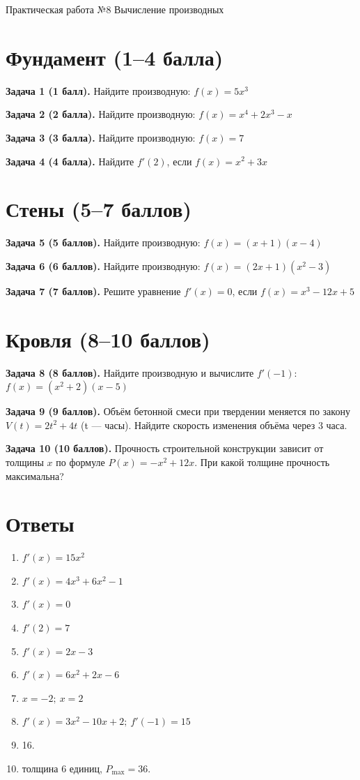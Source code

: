 \documentclass{umk-matematika}
\begin{document}
\maketitlepage
    {Практическая работа №8}
    {Вычисление производных}
    {}

\section{Фундамент (1--4 балла)}

\textbf{Задача 1 (1 балл).} Найдите производную: $f(x) = 5x^3$

\textbf{Задача 2 (2 балла).} Найдите производную: $f(x) = x^4 + 2x^3 - x$

\textbf{Задача 3 (3 балла).} Найдите производную: $f(x) = 7$

\textbf{Задача 4 (4 балла).} Найдите $f'(2)$, если $f(x) = x^2 + 3x$

\section{Стены (5--7 баллов)}

\textbf{Задача 5 (5 баллов).} Найдите производную: $f(x) = (x + 1)(x - 4)$

\textbf{Задача 6 (6 баллов).} Найдите производную: $f(x) = (2x + 1)(x^2 - 3)$

\textbf{Задача 7 (7 баллов).} Решите уравнение $f'(x) = 0$, если $f(x) = x^3 - 12x + 5$

\section{Кровля (8--10 баллов)}

\textbf{Задача 8 (8 баллов).} Найдите производную и вычислите $f'(-1)$: $f(x) = (x^2 + 2)(x - 5)$

\textbf{Задача 9 (9 баллов).} Объём бетонной смеси при твердении меняется по закону $V(t) = 2t^2 + 4t$ (t — часы). Найдите скорость изменения объёма через 3 часа.

\textbf{Задача 10 (10 баллов).} Прочность строительной конструкции зависит от толщины $x$ по формуле $P(x) = -x^2 + 12x$. При какой толщине прочность максимальна?

\newpage
\section*{Ответы}

\begin{enumerate}
  \item $f'(x) = 15x^2$
  \item $f'(x) = 4x^3 + 6x^2 - 1$
  \item $f'(x) = 0$
  \item $f'(2) = 7$
  \item $f'(x) = 2x - 3$
  \item $f'(x) = 6x^2 + 2x - 6$
  \item $x = -2;\ x = 2$
  \item $f'(x) = 3x^2 - 10x + 2;\ f'(-1) = 15$
  \item 16.
  \item толщина 6 единиц, $P_{\max} = 36$.
\end{enumerate}
\end{document}
